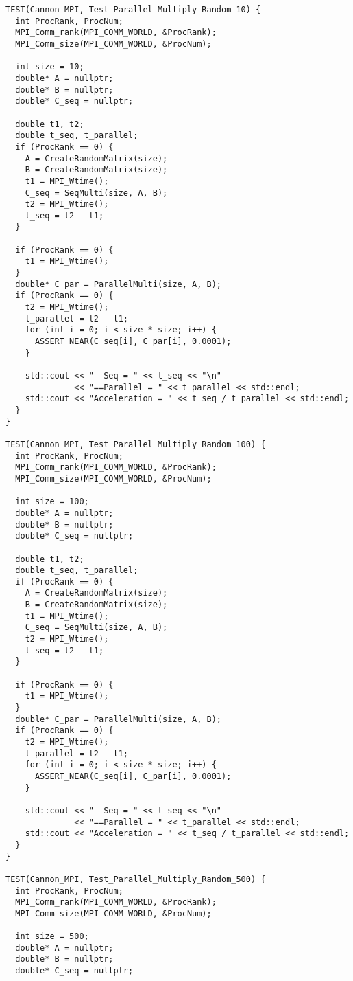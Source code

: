\documentclass[12pt, letterpaper]{article}
\begin{document}
\begin{lstlisting}
TEST(Cannon_MPI, Test_Parallel_Multiply_Random_10) {
  int ProcRank, ProcNum;
  MPI_Comm_rank(MPI_COMM_WORLD, &ProcRank);
  MPI_Comm_size(MPI_COMM_WORLD, &ProcNum);

  int size = 10;
  double* A = nullptr;
  double* B = nullptr;
  double* C_seq = nullptr;

  double t1, t2;
  double t_seq, t_parallel;
  if (ProcRank == 0) {
    A = CreateRandomMatrix(size);
    B = CreateRandomMatrix(size);
    t1 = MPI_Wtime();
    C_seq = SeqMulti(size, A, B);
    t2 = MPI_Wtime();
    t_seq = t2 - t1;
  }

  if (ProcRank == 0) {
    t1 = MPI_Wtime();
  }
  double* C_par = ParallelMulti(size, A, B);
  if (ProcRank == 0) {
    t2 = MPI_Wtime();
    t_parallel = t2 - t1;
    for (int i = 0; i < size * size; i++) {
      ASSERT_NEAR(C_seq[i], C_par[i], 0.0001);
    }

    std::cout << "--Seq = " << t_seq << "\n"
              << "==Parallel = " << t_parallel << std::endl;
    std::cout << "Acceleration = " << t_seq / t_parallel << std::endl;
  }
}

TEST(Cannon_MPI, Test_Parallel_Multiply_Random_100) {
  int ProcRank, ProcNum;
  MPI_Comm_rank(MPI_COMM_WORLD, &ProcRank);
  MPI_Comm_size(MPI_COMM_WORLD, &ProcNum);

  int size = 100;
  double* A = nullptr;
  double* B = nullptr;
  double* C_seq = nullptr;

  double t1, t2;
  double t_seq, t_parallel;
  if (ProcRank == 0) {
    A = CreateRandomMatrix(size);
    B = CreateRandomMatrix(size);
    t1 = MPI_Wtime();
    C_seq = SeqMulti(size, A, B);
    t2 = MPI_Wtime();
    t_seq = t2 - t1;
  }

  if (ProcRank == 0) {
    t1 = MPI_Wtime();
  }
  double* C_par = ParallelMulti(size, A, B);
  if (ProcRank == 0) {
    t2 = MPI_Wtime();
    t_parallel = t2 - t1;
    for (int i = 0; i < size * size; i++) {
      ASSERT_NEAR(C_seq[i], C_par[i], 0.0001);
    }

    std::cout << "--Seq = " << t_seq << "\n"
              << "==Parallel = " << t_parallel << std::endl;
    std::cout << "Acceleration = " << t_seq / t_parallel << std::endl;
  }
}

TEST(Cannon_MPI, Test_Parallel_Multiply_Random_500) {
  int ProcRank, ProcNum;
  MPI_Comm_rank(MPI_COMM_WORLD, &ProcRank);
  MPI_Comm_size(MPI_COMM_WORLD, &ProcNum);

  int size = 500;
  double* A = nullptr;
  double* B = nullptr;
  double* C_seq = nullptr;


\end{lstlisting}
\end{document}
